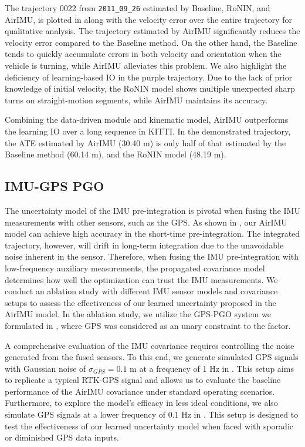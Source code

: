 The trajectory 0022 from \texttt{2011\_09\_26} estimated by Baseline, RoNIN, and AirIMU, is plotted in  along with the velocity error over the entire trajectory for qualitative analysis. 
The trajectory estimated by AirIMU significantly reduces the velocity error compared to the Baseline method. On the other hand, the Baseline tends to quickly accumulate errors in both velocity and orientation when the vehicle is turning, while AirIMU alleviates this problem.
We also highlight the deficiency of learning-based IO in the purple trajectory. Due to the lack of prior knowledge of initial velocity, the RoNIN model shows multiple unexpected sharp turns on straight-motion segments, while AirIMU maintains its accuracy.

Combining the data-driven module and kinematic model, AirIMU outperforms the learning IO over a long sequence in KITTI.
In the demonstrated trajectory, the ATE estimated by AirIMU (30.40 \si{\meter}) is only half of that estimated by the Baseline method (60.14 \si{\meter}), and the RoNIN model (48.19 \si{\meter}).


\subsection{IMU-GPS PGO}\label{Exp: PGO}
The uncertainty model of the IMU pre-integration is pivotal when fusing the IMU measurements with other sensors, such as the GPS.
As shown in , our AirIMU model can achieve high accuracy in the short-time pre-integration. 
The integrated trajectory, however, will drift in long-term integration due to the unavoidable noise inherent in the sensor. 
Therefore, when fusing the IMU pre-integration with low-frequency auxiliary measurements, the propagated covariance model determines how well the optimization can trust the IMU measurements.
We conduct an ablation study with different IMU sensor models and covariance setups to assess the effectiveness of our learned uncertainty proposed in the AirIMU model.
In the ablation study, we utilize the GPS-PGO system we formulated in , where GPS was considered as an unary constraint to the factor.

A comprehensive evaluation of the IMU covariance requires controlling the noise generated from the fused sensors.
To this end, we generate simulated GPS signals with Gaussian noise of $\sigma_{GPS} = 0.1$ \si{\meter} at a frequency of 1 Hz in . 
This setup aims to replicate a typical RTK-GPS signal and allows us to evaluate the baseline performance of the AirIMU covariance under standard operating scenarios.
Furthermore, to explore the model's efficacy in less ideal conditions, we also simulate GPS signals at a lower frequency of 0.1 Hz in . 
This setup is designed to test the effectiveness of our learned uncertainty model when faced with sporadic or diminished GPS data inputs.

